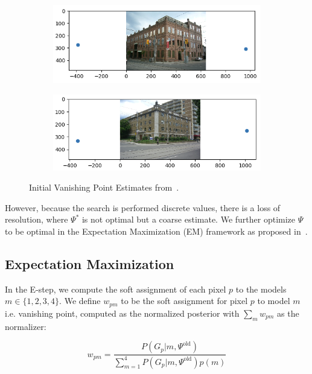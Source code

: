 \documentclass[a4paper]{article}
\begin{document}
	\begin{figure}[ht]
		\centering
		\begin{subfigure}
			\centering
			\includegraphics[width=0.9\columnwidth]{images/vp_init1.png}
		\end{subfigure}
		\begin{subfigure}
			\centering
			\includegraphics[width=0.9\columnwidth]{images/vp_init2.png}
		\end{subfigure}
		\caption{\label{fig:initial_vp}Initial Vanishing Point Estimates from~\cite{Coughlan:2000:MWA:3008751.3008869}.}
	\end{figure}
	
	However, because the search is performed discrete values, there is a loss of resolution, where $\Psi^*$ is not optimal but a coarse estimate. We further optimize $\Psi$ to be optimal in the Expectation Maximization (EM) framework as proposed in~\cite{atlanta-world}.
	
	\subsection{Expectation Maximization}
	
	In the E-step, we compute the soft assignment of each pixel $p$ to the models $m \in \{1, 2, 3, 4\}$. We define $w_{pm}$ to be the soft assignment for pixel $p$ to model $m$ i.e. vanishing point, computed as the normalized posterior with $\sum_m w_{pm}$ as the normalizer:
	
	\begin{equation}
		w_{pm} = \frac{P\left(G_{p} | m, \Psi^\text{old}\right)}{\sum_{m=1}^{4} P\left(G_{p} | m, \Psi^\text{old}\right) p(m)}
	\end{equation}
	
\end{document}
